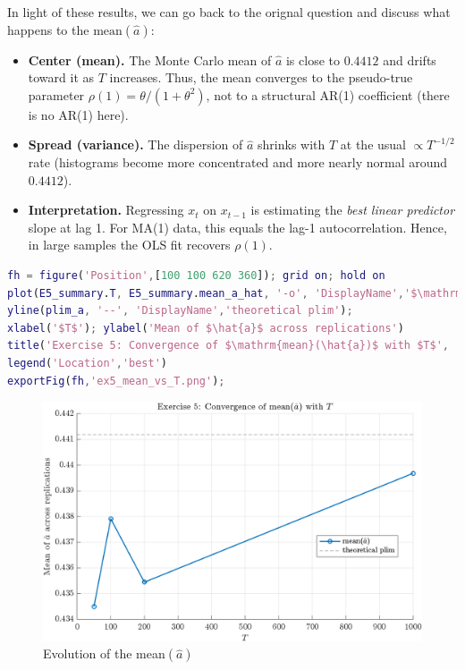 \documentclass[dvipsnames,11pt]{article}
\begin{document}
\begin{solution}
        In light of these results, we can go back to the orignal question and discuss what happens to the \(\mathrm{mean}(\hat a) \):

        \begin{itemize}
            \item \textbf{Center (mean).} The Monte Carlo mean of $\hat a$ is close to $0.4412$ and drifts toward it as $T$ increases. Thus, the mean converges to the pseudo-true parameter $\rho(1)=\theta/(1+\theta^2)$, not to a structural AR(1) coefficient (there is no AR(1) here).
          
            \item \textbf{Spread (variance).} The dispersion of $\hat a$ shrinks with $T$ at the usual $\propto T^{-1/2}$ rate (histograms become more concentrated and more nearly normal around $0.4412$).
          
            \item \textbf{Interpretation.} Regressing $x_t$ on $x_{t-1}$ is estimating the \emph{best linear predictor} slope at lag 1. For MA(1) data, this equals the lag-1 autocorrelation. Hence, in large samples the OLS fit recovers $\rho(1)$.
        \end{itemize}

\begin{lstlisting}[language=matlab]
% Optional: plot mean(\hat{a}) across T for a compact summary figure
fh = figure('Position',[100 100 620 360]); grid on; hold on
plot(E5_summary.T, E5_summary.mean_a_hat, '-o', 'DisplayName','$\mathrm{mean}(\hat{a})$');
yline(plim_a, '--', 'DisplayName','theoretical plim');
xlabel('$T$'); ylabel('Mean of $\hat{a}$ across replications')
title('Exercise 5: Convergence of $\mathrm{mean}(\hat{a})$ with $T$', 'Interpreter','latex')
legend('Location','best')
exportFig(fh,'ex5_mean_vs_T.png');
\end{lstlisting}

        \begin{figure}[h]
            \centering
            \includegraphics[width=0.65\linewidth]{output/ex5_mean_vs_T.png}
            \caption{Evolution of the mean\((\hat{a})\)}
            \label{fig:placeholder}
        \end{figure}
        
    \end{solution}
\end{document}
